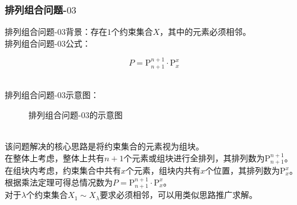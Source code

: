 \documentclass[UTF8]{ctexart}
\newcommand{\rnum}[1]{\uppercase\expandafter{\romannumeral #1\relax}}
\newcommand{\Pe}{\mathrm{P}}
\begin{document}
\newpage

\subsubsection{排列组合问题\rnum{1}-$03$}
    排列组合问题\rnum{1}-$03$背景：存在$1$个约束集合$X$，其中的元素必须相邻。\\[3mm]
    排列组合问题\rnum{1}-$03$公式：
    \begin{large}
        \begin{equation*}
            P=\Pe_{n+1}^{n+1}\cdot\Pe_x^x
        \end{equation*}
    \end{large}\\
    排列组合问题\rnum{1}-$03$示意图：
    \begin{figure}[h]
        \begin{center}
            \caption{排列组合问题\rnum{1}-$03$的示意图}
        \end{center}
    \end{figure}\\
    该问题解决的核心思路是将约束集合的元素视为组块。\\[3mm]
    在整体上考虑，整体上共有$n+1$个元素或组块进行全排列，其排列数为$\Pe_{n+1}^{n+1}$。\\[3mm]
    在组块内考虑，约束集合中共有$x$个元素，组块内共有$x$个位置，其排列数为$\Pe_{x}^{x}$。\\[3mm]
    根据乘法定理可得总情况数为$P=\Pe_{n+1}^{n+1}\cdot\Pe_x^x$。\\[6mm]
    对于$\lambda$个约束集合$X_1\sim X_\lambda$要求必须相邻，可以用类似思路推广求解。
\end{document}
